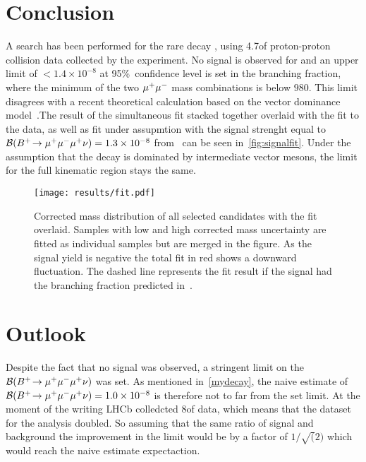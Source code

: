 \section{Conclusion}
A search has been performed for the rare decay \Bmumumu, using 4.7\invfb of proton-proton collision data collected by the \lhcb experiment. No signal is observed for \Bmumumu and an upper limit of $< 1.4\times 10^{-8}$ at 95\%~confidence level is set in the branching fraction, where the minimum of the two ${\mu^+\mu^-}$ mass combinations is below $980$\mevcc. This limit disagrees with a recent theoretical calculation based on the vector dominance model~\cite{Danilina:2018uzr}.The result of the simultaneous fit stacked together overlaid with the fit to the data, as well as fit under assupmtion with the signal strenght equal to $\mathcal{B}({{{B}^+}}\!\rightarrow {\ensuremath{\mu^+\mu^-\mu^+}}\nu)=1.3\times 10^{-8}$ from~\cite{Danilina:2018uzr} can be seen in~\autoref{fig:signalfit}. Under the assumption that the decay is dominated by intermediate vector mesons, the limit for the full kinematic region stays the same.


\begin{figure}[t]
  \centering
  \texttt{[image: results/fit.pdf]}
  \caption{Corrected mass distribution of all selected \Bmumumu
    candidates with the fit overlaid. Samples with low and high
    corrected mass uncertainty are fitted as individual samples but
    are merged in the figure. As the signal yield is negative the total fit
    in red shows a downward fluctuation. The dashed line represents the fit
    result if the signal had the branching fraction predicted in~\cite{Danilina:2018uzr}.}
  \label{fig:signalfit}
\end{figure}



\section{Outlook}
Despite the fact that no signal was observed, a stringent limit on the $\mathcal{B}({{{B}^+}}\!\rightarrow {\ensuremath{\mu^+\mu^-\mu^+}}\nu)$ was set. As mentioned in~\autoref{mydecay}, the naive estimate of $\mathcal{B}({{{B}^+}}\!\rightarrow {\ensuremath{\mu^+\mu^-\mu^+}}\nu)=1.0\times 10^{-8}$ is therefore not to far from the set limit. At the moment of the writing \gls{LHCb} colledcted 8\invfb of data, which means that the dataset for the analysis doubled. So assuming that the same ratio of signal and background the improvement in the limit would be by a factor of $1/\sqrt(2)$ which would reach the naive estimate expectaction. 


